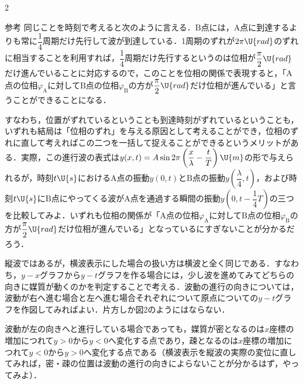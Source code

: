 \begin{multicols}{2}
\begin{bsHosoku}{参考}
同じことを時刻で考えると次のように言える．$\mathrm{B}$点には，$\mathrm{A}$点に到達するよりも常に$\dfrac{1}{4}$周期だけ先行して波が到達している．1周期のずれが$2\pi\U{rad}$のずれに相当することを利用すれば，$\dfrac{1}{4}$周期だけ先行するというのは位相が$\dfrac{\pi}{2}\U{rad}$だけ進んでいることに対応するので，このことを位相の関係で表現すると，「$\mathrm{A}$点の位相$\varphi_\mathrm{A}$に対して$\mathrm{B}$点の位相$\varphi_\mathrm{B}$の方が$\dfrac{\pi}{2}\U{rad}$だけ位相が進んでいる」と言うことができることになる．

すなわち，位置がずれているということも到達時刻がずれているということも，いずれも結局は「位相のずれ」を与える原因として考えることができ，位相のずれに直して考えればこの二つを一括して捉えることができるというメリットがある．実際，この進行波の表式は$y(x,t)=A\sin 2\pi\left(\dfrac{x}{\lambda}-\dfrac{t}{T}\right)\U{m}$の形で与えられるが，時刻$t\U{s}$における$\mathrm{A}$点の振動$y(0,t)$と$\mathrm{B}$点の振動$y\left(\dfrac{\lambda}{4},t\right)$，および時刻$t\U{s}$に$\mathrm{B}$点にやってくる波が$\mathrm{A}$点を通過する瞬間の振動$y\left(0,t-\dfrac{1}{4}T\right)$の三つを比較してみよ．いずれも位相の関係が「$\mathrm{A}$点の位相$\varphi_\mathrm{A}$に対して$\mathrm{B}$点の位相$\varphi_\mathrm{B}$の方が$\dfrac{\pi}{2}\U{rad}$だけ位相が進んでいる」となっているにすぎないことが分かるだろう．
\end{bsHosoku}

\par\nopagebreak
\begin{sisin}
縦波ではあるが，横波表示にした場合の扱い方は横波と全く同じである．すなわち，$y-x$グラフから$y-t$グラフを作る場合には，少し波を進めてみてどちらの向きに媒質が動くのかを判定することで考える．波動の進行の向きについては，波動が右へ進む場合と左へ進む場合それぞれについて原点についての$y-t$グラフを作図してみればよい．片方しか図2のようにはならない．

波動が左の向きへと進行している場合であっても，{\gtfamily 媒質が密となるのは$x$座標の増加につれて}{\gtfamily $y>0$から$y<0$へ変化する点であり，}{\gtfamily 疎となるのは$x$座標の増加につれて}{\gtfamily $y<0$から$y>0$へ変化する点である}（横波表示を縦波の実際の変位に直してみれば，密・疎の位置は波動の進行の向きによらないことが分かるはず，やってみよ）．


\end{sisin}
\end{multicols}
